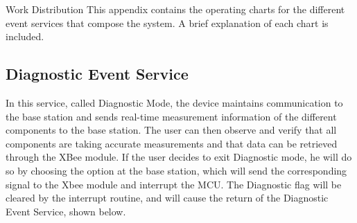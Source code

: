 \begin{customAppendixPage}{Work Distribution}
This appendix contains the operating charts for the different event services that compose the system.  A brief explanation of each chart is included.
\end{customAppendixPage}
\renewcommand*{\thepage}{\thesection-\arabic{page}}

\subsection{Diagnostic Event Service}

In this service, called Diagnostic Mode, the device maintains communication to the base station and sends real-time measurement information of the different components to the base station. The user can then observe and verify that all components are taking accurate measurements and that data can be retrieved through the XBee module. If the user decides to exit Diagnostic mode, he will do so by choosing the option at the base station, which will send the corresponding signal to the Xbee module and interrupt the MCU. The Diagnostic flag will be cleared by the interrupt routine, and will cause the return of the Diagnostic Event Service, shown below.


